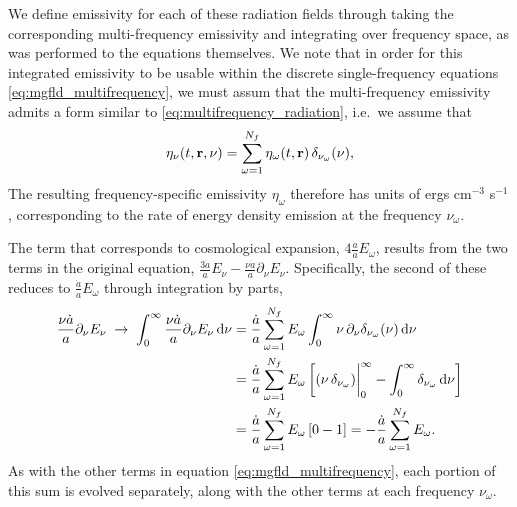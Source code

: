 \documentclass[10pt]{article}
\renewcommand{\(}{\left(}
\renewcommand{\)}{\right)}
\newcommand{\rvec}{{\bf r}}
\newcommand{\adot}{\dot{a}}
\newcommand{\Enu}{E_{\nu}}
\begin{document}
We define emissivity for each of these radiation fields through taking
the corresponding multi-frequency emissivity and integrating over
frequency space, as was performed to the equations themselves.  We
note that in order for this integrated emissivity to be usable within
the discrete single-frequency equations
\eqref{eq:mgfld_multifrequency}, we must assum that the
multi-frequency emissivity admits a form similar to
\eqref{eq:multifrequency_radiation}, i.e.~we assume that
\begin{equation}
\label{eq:multifrequency_emissivity}
  \eta_{\nu}(t,\rvec,\nu) = \sum_{\omega=1}^{N_f}
  \eta_{\omega}(t,\rvec)\, \delta_{\nu_{\omega}}(\nu), 
\end{equation}
The resulting frequency-specific emissivity $\eta_{\omega}$ therefore
has units of ergs cm$^{-3}$ s$^{-1}$, corresponding to the rate of
energy density emission at the frequency $\nu_{\omega}$.

The term that corresponds to cosmological expansion,
$4\frac{\adot}{a}E_{\omega}$, results from the two terms in the
original equation, 
$\frac{3 \adot}{a} \Enu - \frac{\nu \adot}{a}\partial_{\nu}\Enu$.  
Specifically, the second of these reduces to
$\frac{\adot}{a}E_{\omega}$ through integration by parts,
\begin{align}
\notag
   \frac{\nu \adot}{a}\partial_{\nu}\Enu \;\rightarrow\;
   \int_{0}^{\infty} \frac{\nu \adot}{a}\partial_{\nu}\Enu\,\mathrm d\nu
   &=
   \frac{\adot}{a} \sum_{\omega=1}^{N_f} E_{\omega} \int_{0}^{\infty} \nu\,\partial_{\nu}\delta_{\nu_{\omega}}(\nu)\,\mathrm d\nu \\
\label{eq:multifrequency_redshifting}
   &=
   \frac{\adot}{a} \sum_{\omega=1}^{N_f} E_{\omega}
   \left[(\nu\,\delta_{\nu_{\omega}})\bigg\vert_{0}^{\infty} - \int_{0}^{\infty} \delta_{\nu_{\omega}}\,\mathrm d\nu\right]\\
\notag
   &=
   \frac{\adot}{a} \sum_{\omega=1}^{N_f} E_{\omega}
   \left[0 - 1\right] = -\frac{\adot}{a} \sum_{\omega=1}^{N_f} E_{\omega}.
\end{align}
As with the other terms in equation \eqref{eq:mgfld_multifrequency},
each portion of this sum is evolved separately, along with the
other terms at each frequency $\nu_{\omega}$.
\end{document}
